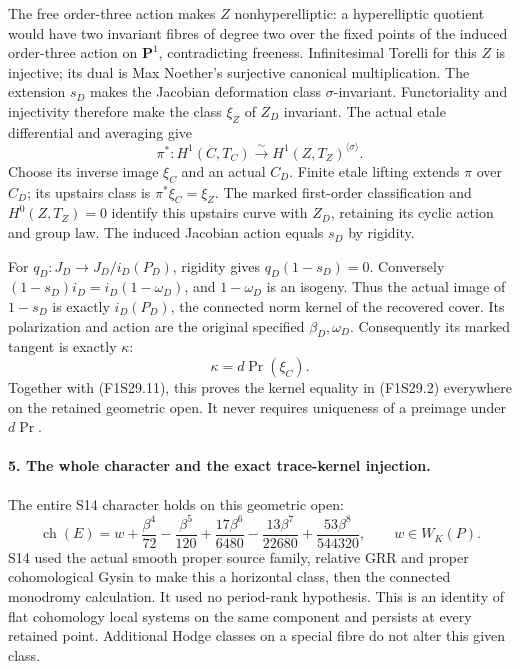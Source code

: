The free order-three action makes $Z$ nonhyperelliptic:
a hyperelliptic quotient would have two invariant
fibres of degree two over the fixed points of the
induced order-three action on $\mathbf P^1$, contradicting
freeness. Infinitesimal Torelli for this $Z$ is injective;
its dual is Max Noether's surjective canonical
multiplication. The extension $s_D$ makes the Jacobian
deformation class $\sigma$-invariant. Functoriality
and injectivity therefore make the class $\xi_Z$
of $Z_D$ invariant. The actual etale differential
and averaging give
\[
 \pi^*:H^1(C,T_C)\xrightarrow{\sim}
                      H^1(Z,T_Z)^{\langle\sigma\rangle}.
 \tag{F1S29.14}
\]
Choose its inverse image $\xi_C$ and an actual $C_D$.
Finite etale lifting extends $\pi$ over $C_D$; its
upstairs class is $\pi^*\xi_C=\xi_Z$. The marked
first-order classification and $H^0(Z,T_Z)=0$ identify
this upstairs curve with $Z_D$, retaining its cyclic
action and group law. The induced Jacobian action
equals $s_D$ by rigidity.

For $q_D:J_D\to J_D/i_D(P_D)$, rigidity gives
$q_D(1-s_D)=0$. Conversely
$(1-s_D)i_D=i_D(1-\omega_D)$, and $1-\omega_D$
is an isogeny. Thus the actual image of $1-s_D$
is exactly $i_D(P_D)$, the connected norm kernel
of the recovered cover. Its polarization and action
are the original specified $\beta_D,\omega_D$.
Consequently its marked tangent is exactly $\kappa$:
\[
                            \kappa=d\operatorname{Pr}(\xi_C).
 \tag{F1S29.15}
\]
Together with (F1S29.11), this proves the kernel
equality in (F1S29.2) everywhere on the retained
geometric open. It never requires uniqueness of
a preimage under $d\operatorname{Pr}$.

\paragraph{5. The whole character and the exact trace-kernel injection.}
The entire S14 character holds on this geometric open:
\[
 \operatorname{ch}(E)=w+\frac{\beta^4}{72}
       -\frac{\beta^5}{120}+\frac{17\beta^6}{6480}
       -\frac{13\beta^7}{22680}+\frac{53\beta^8}{544320},
 \qquad w\in W_K(P).
 \tag{F1S29.16}
\]
S14 used the actual smooth proper source family,
relative GRR and proper cohomological Gysin to
make this a horizontal class, then the connected
monodromy calculation. It used no period-rank
hypothesis. This is an identity of flat cohomology
local systems on the same component and persists
at every retained point. Additional Hodge classes
on a special fibre do not alter this given class.

